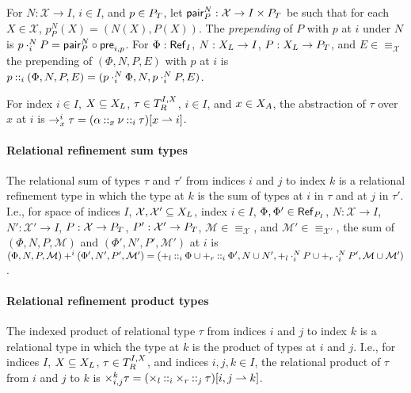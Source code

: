 For $N : \mathcal{X} \to I$, $i \in I$, and $p \in P_T$, let
$\mathsf{pair}_{P}^N : \mathcal{X} \to I \times P_T$ be such that
for each $X \in \mathcal{X}$, $p_{P}^N(X) = (N(X), P(X))$.
%
The \emph{prepending} of $P$ with $p$ at $i$ under $N$ is
$p \cdot_{i}^{N} P = \mathsf{pair}_{P}^{N} \circ
\mathsf{pre}_{i, p}$.
%
For $\Phi : \mathsf{Ref}_{ I }$, $N : X_L \to I$,
$P : X_L \to P_T$, and $E \in \equiv_{\mathcal{X}}$ the
prepending of $(\Phi, N, P, E)$ with $p$ at $i$ is
$p \mathbin{::}_{i} (\Phi, N, P, E) = (p \cdot_{i}^{N} \Phi, N, p
\cdot_{i}^{N} P, E)$.

For index $i \in I$, $X \subseteq X_L$,
$\tau \in T_{R}^{I, X}$, $i \in I$, and $x \in X_A$, the
abstraction of $\tau$ over $x$ at $i$ is
$\to_x^i \tau =  (\alpha \mathbin{::}_{x} \nu
  \mathbin{::}_{i} \tau)[ x \rightharpoonup i ]$.

\paragraph{Relational refinement sum types} The relational sum of
types $\tau$ and $\tau'$ from indices $i$ and $j$ to index $k$ is a
relational refinement type in which the type at $k$ is the sum of
types at $i$ in $\tau$ and at $j$ in $\tau'$.
%
I.e., for space of indices $I$,
$\mathcal{X}, \mathcal{X}' \subseteq X_L$, index $i \in I$,
$\Phi, \Phi' \in \mathsf{Ref}_{ P_{I} }$,
$N : \mathcal{X} \to I$, $N' : \mathcal{X}' \to I$,
$P : \mathcal{X} \to P_T$, $P' : \mathcal{X}' \to P_T$, 
$\mathcal{M} \in \equiv_{\mathcal{X}}$, and
$\mathcal{M}' \in \equiv_{\mathcal{X}'}$, the sum of
$(\Phi, N, P, \mathcal{M})$ and $(\Phi', N', P', \mathcal{M}')$ at $i$
is $(\Phi, N, P, \mathcal{M}) +^i (\Phi', N', P', \mathcal{M}') = %
(\tyleftsum \prepend{i} \Phi \union \tyrightsum \prepend{i} \Phi',
N \union N',
\tyleftsum \fullprepend{i}{N} P \union \tyrightsum \fullprepend{i}{N}
P',
\mathcal{M} \union \mathcal{M}')$.

\paragraph{Relational refinement product types}
The indexed product of relational type $\tau$ from indices $i$ and $j$
to index $k$ is a relational type in which the type at $k$ is the
product of types at $i$ and $j$.
%
I.e., for indices $I$, $X \subseteq X_L$,
$\tau \in T_{R}^{I, X}$, and indices $i, j, k \in I$, the
relational product of $\tau$ from $i$ and $j$ to $k$ is
$\times_{i, j}^k \tau =  (\times_l \mathbin{::}_{i} \times_r
  \mathbin{::}_{j} \tau)[  i, j  \rightharpoonup k ]$.

